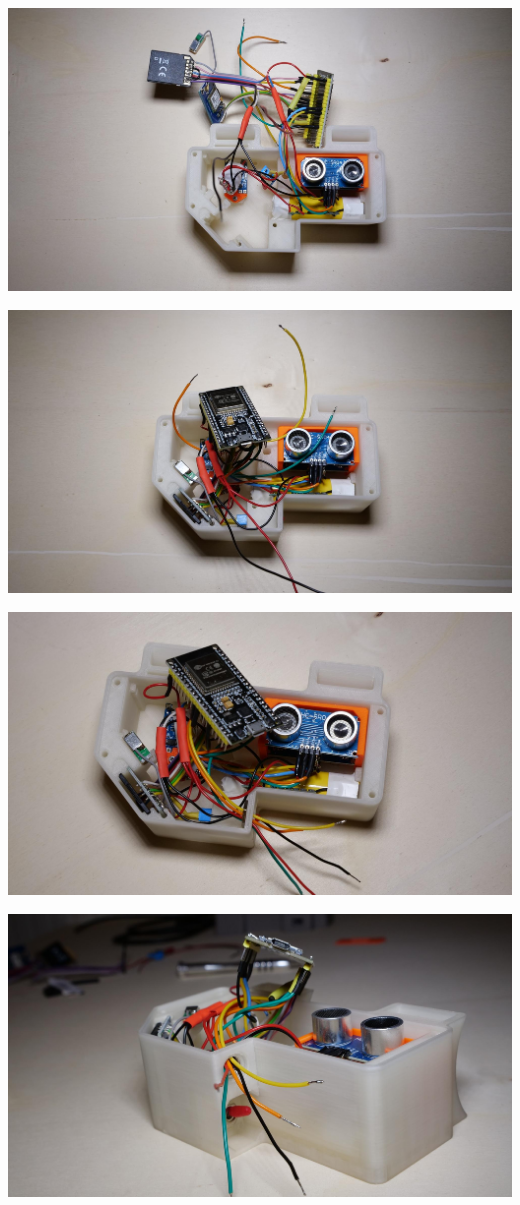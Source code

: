 \documentclass[
]{article}
\begin{document}
{\includegraphics{images/image17.jpg}}

{\includegraphics{images/image11.jpg}}

{\includegraphics{images/image15.jpg}}

{\includegraphics{images/image12.jpg}}
\end{document}

